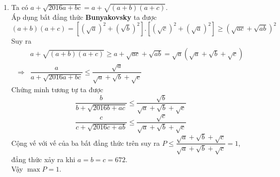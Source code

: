 \begin{ex}
{\begin{enumerate}
        \item Ta có $a+\sqrt{2016a+bc}=a+\sqrt{(a+b)(a+c)}$.\\
         Áp dụng bất đẳng thức \textbf{Bunyakovsky} ta được
        $$(a+b)(a+c)=\left[\left(\sqrt{a}\right)^2+\left(\sqrt{b}\right)^2\right].\left[\left(\sqrt{c}\right)^2+\left(\sqrt{a}\right)^2\right] \geq \left(\sqrt{ac}+\sqrt{ab}\right)^2$$
        Suy ra
         {\allowdisplaybreaks
          \begin{align*}
      		& a+\sqrt{(a+b)(a+c)}\geq a+\sqrt{ac}+\sqrt{ab}=\sqrt{a}\left(\sqrt{a}+\sqrt{b}+\sqrt{c}\right)\\
      		\Rightarrow & \dfrac{a}{a+\sqrt{2016a+bc}}\leq \dfrac{\sqrt{a}}{\sqrt{a}+\sqrt{b}+\sqrt{c}}
        \end{align*}}
        Chứng minh tương tự ta được
        $$\dfrac{b}{b+\sqrt{2016b+ac}}\leq \dfrac{\sqrt{b}}{\sqrt{a}+\sqrt{b}+\sqrt{c}}$$
        $$\dfrac{c}{c+\sqrt{2016c+ab}}\leq \dfrac{\sqrt{c}}{\sqrt{a}+\sqrt{b}+\sqrt{c}}$$
        Cộng vế với vế của ba bất đẳng thức trên suy ra $P \le \dfrac{\sqrt{a}+\sqrt{b}+\sqrt{c}}{\sqrt{a}+\sqrt{b}+\sqrt{c}}=1$, đẳng thức xảy ra khi $a=b=c=672$.\\
        Vậy $\max P =1$.
        
        
    \end{enumerate}
    }
\end{ex}

